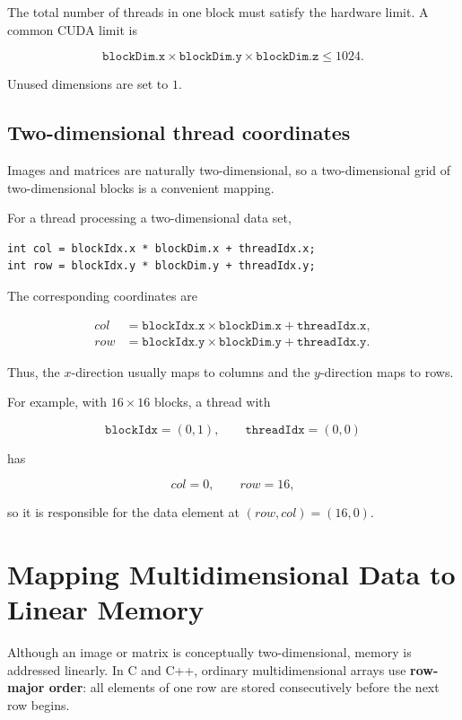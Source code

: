 \documentclass[11pt,a4paper]{article}
\begin{document}
The total number of threads in one block must satisfy the hardware limit. A common CUDA limit is

\[
\texttt{blockDim.x}
\times
\texttt{blockDim.y}
\times
\texttt{blockDim.z}
\le 1024.
\]

Unused dimensions are set to \(1\).

\subsection{Two-dimensional thread coordinates}

Images and matrices are naturally two-dimensional, so a two-dimensional grid of two-dimensional blocks is a convenient mapping.

For a thread processing a two-dimensional data set,

\begin{lstlisting}
int col = blockIdx.x * blockDim.x + threadIdx.x;
int row = blockIdx.y * blockDim.y + threadIdx.y;
\end{lstlisting}

The corresponding coordinates are

\[
\boxed{
\begin{aligned}
col &= \texttt{blockIdx.x}\times\texttt{blockDim.x}
      +\texttt{threadIdx.x},\\
row &= \texttt{blockIdx.y}\times\texttt{blockDim.y}
      +\texttt{threadIdx.y}.
\end{aligned}
}
\]

Thus, the \(x\)-direction usually maps to columns and the \(y\)-direction maps to rows.

For example, with \(16\times16\) blocks, a thread with

\[
\texttt{blockIdx}=(0,1),
\qquad
\texttt{threadIdx}=(0,0)
\]

has

\[
col=0,
\qquad
row=16,
\]

so it is responsible for the data element at \((row,col)=(16,0)\).

\section{Mapping Multidimensional Data to Linear Memory}

Although an image or matrix is conceptually two-dimensional, memory is addressed linearly. In C and C++, ordinary multidimensional arrays use \textbf{row-major order}: all elements of one row are stored consecutively before the next row begins.
\end{document}

